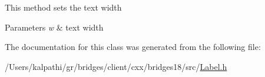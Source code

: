 This method sets the text width


\begin{DoxyParams}{Parameters}
{\em w} & text width \\
\hline
\end{DoxyParams}


The documentation for this class was generated from the following file\+:\begin{DoxyCompactItemize}
\item 
/\+Users/kalpathi/gr/bridges/client/cxx/bridges18/src/\mbox{\hyperlink{_label_8h}{Label.\+h}}\end{DoxyCompactItemize}
